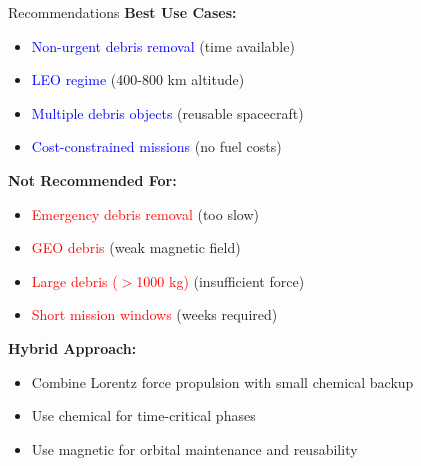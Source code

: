 \documentclass[aspectratio=169]{beamer}
\begin{document}
\begin{frame}{Recommendations}
\textbf{Best Use Cases:}
\begin{itemize}
    \item \textcolor{blue}{Non-urgent debris removal} (time available)
    \item \textcolor{blue}{LEO regime} (400-800 km altitude)
    \item \textcolor{blue}{Multiple debris objects} (reusable spacecraft)
    \item \textcolor{blue}{Cost-constrained missions} (no fuel costs)
\end{itemize}

\vspace{1em}
\textbf{Not Recommended For:}
\begin{itemize}
    \item \textcolor{red}{Emergency debris removal} (too slow)
    \item \textcolor{red}{GEO debris} (weak magnetic field)
    \item \textcolor{red}{Large debris ($>$1000 kg)} (insufficient force)
    \item \textcolor{red}{Short mission windows} (weeks required)
\end{itemize}

\vspace{1em}
\textbf{Hybrid Approach:}
\begin{itemize}
    \item Combine Lorentz force propulsion with small chemical backup
    \item Use chemical for time-critical phases
    \item Use magnetic for orbital maintenance and reusability
\end{itemize}
\end{frame}
\end{document}
